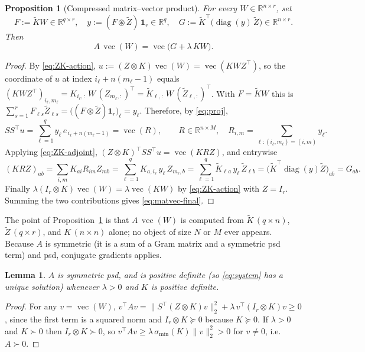 \documentclass[12pt]{article}
\DeclareMathOperator{\vecop}{vec}
\DeclareMathOperator{\diag}{diag}
\newcommand{\bR}{\mathbb{R}}
\newcommand{\tZ}{\tilde{Z}}
\newcommand{\tK}{\tilde{K}}
\newtheorem{lemma}{Lemma}
\newtheorem{proposition}{Proposition}
\begin{document}
\begin{proposition}[Compressed matrix--vector product]\label{prop:matvec}
For every $W\in\bR^{n\times r}$, set
\begin{equation}\label{eq:matvec-steps}
  F:=\tK W\in\bR^{q\times r},\quad
  y:=(F\circledast\tZ)\,\mathbf 1_r\in\bR^{q},\quad
  G:=\tK^{\top}\big(\diag(y)\,\tZ\big)\in\bR^{n\times r}.
\end{equation}
Then
\begin{equation}\label{eq:matvec-final}
  A\,\vecop(W)=\vecop\!\big(G+\lambda\,KW\big).
\end{equation}
\end{proposition}

\begin{proof}
By \eqref{eq:ZK-action}, $u:=(Z\otimes K)\vecop(W)=\vecop(KWZ^{\top})$, so
the coordinate of $u$ at index $i_\ell+n(m_\ell-1)$ equals
$(KWZ^{\top})_{i_\ell,m_\ell}=K_{i_\ell,:}\,W\,(Z_{m_\ell,:})^{\top}
=\tK_{\ell,:}\,W\,(\tZ_{\ell,:})^{\top}$. With $F=\tK W$ this is
$\sum_{s=1}^r F_{\ell s}\tZ_{\ell s}=\big((F\circledast\tZ)\mathbf
1_r\big)_\ell=y_\ell$. Therefore, by \eqref{eq:proj},
\[
  SS^{\top}u=\sum_{\ell=1}^{q}y_\ell\,e_{\,i_\ell+n(m_\ell-1)}
  =\vecop(R),\qquad
  R\in\bR^{n\times M},\quad R_{i,m}=\!\!\sum_{\ell:(i_\ell,m_\ell)=(i,m)}\!\!y_\ell .
\]
Applying \eqref{eq:ZK-adjoint},
$(Z\otimes K)^{\top}SS^{\top}u=\vecop(KRZ)$, and entrywise
\[
  (KRZ)_{a b}=\sum_{i,m}K_{a i}R_{i m}Z_{m b}
  =\sum_{\ell=1}^q K_{a,i_\ell}\,y_\ell\,Z_{m_\ell,b}
  =\sum_{\ell=1}^q \tK_{\ell a}\,y_\ell\,\tZ_{\ell b}
  =\big(\tK^{\top}\diag(y)\tZ\big)_{ab}=G_{ab}.
\]
Finally $\lambda(I_r\otimes K)\vecop(W)=\lambda\vecop(KW)$ by
\eqref{eq:ZK-action} with $Z=I_r$. Summing the two contributions gives
\eqref{eq:matvec-final}.
\end{proof}

The point of Proposition~\ref{prop:matvec} is that
$A\,\vecop(W)$ is computed from $\tK\,(q\times n)$, $\tZ\,(q\times r)$, and
$K\,(n\times n)$ alone; no object of size $N$ or $M$ ever appears. Because
$A$ is symmetric (it is a sum of a Gram matrix and a symmetric psd term)
and psd, conjugate gradients applies.

\begin{lemma}\label{lem:spd}
$A$ is symmetric psd, and is positive definite (so \eqref{eq:system} has a
unique solution) whenever $\lambda>0$ and $K$ is positive definite.
\end{lemma}
\begin{proof}
For any $v=\vecop(W)$,
$v^{\top}Av=\|S^{\top}(Z\otimes K)v\|_2^2
+\lambda\,v^{\top}(I_r\otimes K)v\ge 0$, since the first term is a squared
norm and $I_r\otimes K\succeq0$ because $K\succeq0$. If $\lambda>0$ and
$K\succ0$ then $I_r\otimes K\succ0$, so $v^{\top}Av\ge\lambda\,
\sigma_{\min}(K)\|v\|_2^2>0$ for $v\ne0$, i.e.\ $A\succ0$.
\end{proof}
\end{document}
